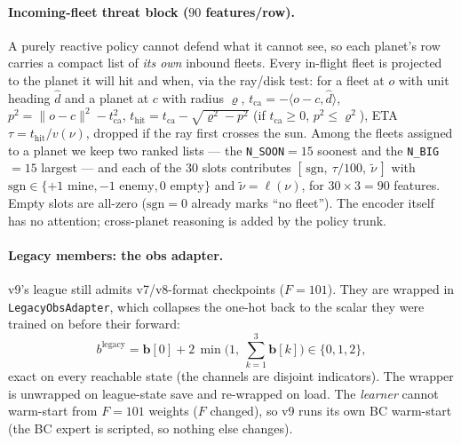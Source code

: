 \documentclass[11pt]{article}
\newcommand{\cd}[1]{\texttt{#1}}
\begin{document}
\paragraph{Incoming-fleet threat block ($90$ features/row).} A purely reactive policy cannot defend
what it cannot see, so each planet's row carries a compact list of \emph{its own} inbound fleets. Every
in-flight fleet is projected to the planet it will hit and when, via the ray/disk test: for a fleet at
$o$ with unit heading $\hat d$ and a planet at $c$ with radius $\varrho$,
$t_{\mathrm{ca}}=-\langle o-c,\hat d\rangle$, $p^2=\lVert o-c\rVert^2-t_{\mathrm{ca}}^2$,
$t_{\mathrm{hit}}=t_{\mathrm{ca}}-\sqrt{\varrho^2-p^2}$ (if $t_{\mathrm{ca}}\!\ge\!0$,
$p^2\!\le\!\varrho^2$), ETA $\tau=t_{\mathrm{hit}}/v(\nu)$, dropped if the ray first crosses the sun.
Among the fleets assigned to a planet we keep two ranked lists --- the \cd{N\_SOON}$=15$ soonest and the
\cd{N\_BIG}$=15$ largest --- and each of the $30$ slots contributes
$[\,\mathrm{sgn},\ \tau/100,\ \widetilde\nu\,]$ with $\mathrm{sgn}\in\{+1\text{ mine},-1\text{ enemy},
0\text{ empty}\}$ and $\widetilde\nu=\ell(\nu)$, for $30\times3=90$ features. Empty slots are all-zero
($\mathrm{sgn}{=}0$ already marks ``no fleet''). The encoder itself has no attention; cross-planet
reasoning is added by the policy trunk.

\paragraph{Legacy members: the obs adapter.} v9's league still admits v7/v8-format checkpoints
($F{=}101$). They are wrapped in \cd{LegacyObsAdapter}, which collapses the one-hot back to the scalar
they were trained on before their forward:
\begin{equation}
b^{\text{legacy}}=\mathbf b[0]+2\,\min\!\big(1,\ \textstyle\sum_{k=1}^{3}\mathbf b[k]\big)\in\{0,1,2\},
\end{equation}
exact on every reachable state (the channels are disjoint indicators). The wrapper is unwrapped on
league-state save and re-wrapped on load. The \emph{learner} cannot warm-start from $F{=}101$ weights
($F$ changed), so v9 runs its own BC warm-start (the BC expert is scripted, so nothing else changes).

\end{document}

